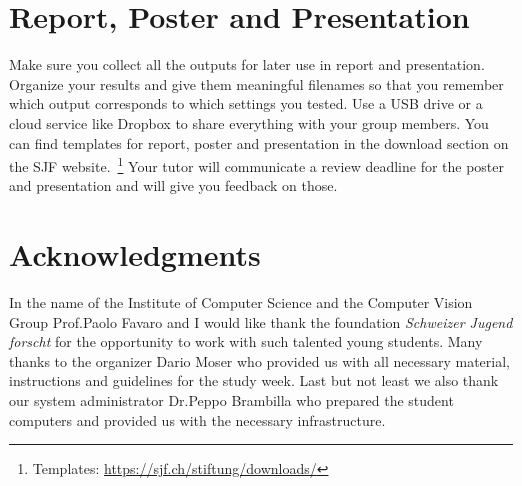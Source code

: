 \documentclass[a4paper]{article}
\begin{document}
\section{Report, Poster and Presentation}

	Make sure you collect all the outputs for later use in report and presentation.
	Organize your results and give them meaningful filenames so that you remember which output corresponds to which settings you tested.
	Use a USB drive or a cloud service like Dropbox to share everything with your group members.
	You can find templates for report, poster and presentation in the download section on the SJF website.~\footnote{
	Templates: \url{https://sjf.ch/stiftung/downloads/}}
	Your tutor will communicate a review deadline for the poster and presentation and will give you feedback on those.
	

\section{Acknowledgments}
	In the name of the Institute of Computer Science and the Computer Vision Group Prof.\@ Paolo Favaro and I would like thank the foundation \emph{Schweizer Jugend forscht} for the opportunity to work with such talented young students. 
	Many thanks to the organizer Dario Moser who provided us with all necessary material, instructions and guidelines for the study week.
	Last but not least we also thank our system administrator Dr.\@ Peppo Brambilla who prepared the student computers and provided us with the necessary infrastructure.
	
\end{document}
